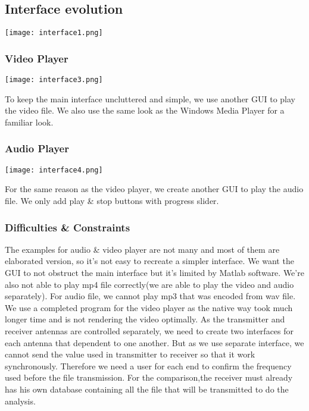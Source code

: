 \documentclass[12pt,a4paper]{article}
\begin{document}
\subsection{Interface evolution}

\texttt{[image: interface1.png]}
\subsubsection{Video Player}
\texttt{[image: interface3.png]}
\par \vspace{0.25cm}To keep the main interface uncluttered and simple, we use another GUI to play the video file. We also use the same look as the Windows Media Player for a familiar look.
\subsubsection{Audio Player}
\texttt{[image: interface4.png]}
\par \vspace{0.25cm}For the same reason as the video player, we create another GUI to play the audio file. We only add play \& stop buttons with progress slider.

\subsubsection{Difficulties \& Constraints}
\par \vspace{0.25cm} The examples for audio \& video player are not many and most of them are elaborated version, so it's not easy to recreate a simpler interface. We want the GUI to not obstruct the main interface but it's limited by Matlab software. We're also not able to play mp4 file correctly(we are able to play the video and audio separately). For audio file, we cannot play mp3 that was encoded from wav file. We use a completed program for the video player as the native way took much longer time and is not rendering the video optimally. As the transmitter and receiver antennas are controlled separately, we need to create two interfaces for each antenna that dependent to one another. But as we use separate interface, we cannot send the value used in transmitter to receiver so that it work synchronously. Therefore we need a user for each end to confirm the frequency used before the file transmission. For the comparison,the receiver must already has his own database containing all the file that will be transmitted to do the analysis.
  
\end{document}
